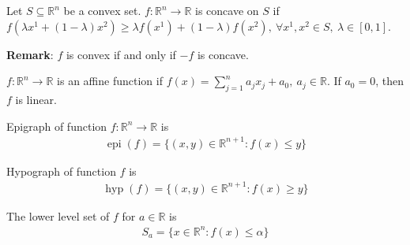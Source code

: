 \documentclass[11pt]{article}
\numberwithin{equation}{section}
\begin{document}
\begin{definition}
    Let $S \subseteq \mathbb{R}^n$ be a convex set. $f:\mathbb{R}^n\rightarrow \mathbb{R}$ is concave on $S$ if $f(\lambda x^1 + (1-\lambda)x^2) \geq \lambda f(x^1) + (1-\lambda)f(x^2), \ \forall x^1,x^2\in S, \ \lambda\in [0,1]$.
\end{definition}

\textbf{Remark}: $f$ is convex if and only if $-f$ is concave. 

\begin{definition}
    $f:\mathbb{R}^n\rightarrow \mathbb{R}$ is an affine function if $f(x)=\sum^n_{j=1}a_jx_j+a_0,\ a_j \in \mathbb{R}$. If $a_0=0$, then $f$ is linear.
\end{definition}
\begin{definition}
    Epigraph of function $f:\mathbb{R}^n\rightarrow \mathbb{R}$ is \begin{align*}
        \operatorname{epi}(f)=\{(x,y)\in \mathbb{R}^{n+1}:f(x)\leq y\}
    \end{align*}
\end{definition}

\begin{definition}
    Hypograph of function $f$ is \begin{align*}
        \operatorname{hyp}(f)=\{(x,y)\in \mathbb{R}^{n+1}:f(x)\geq y\}
    \end{align*}
\end{definition}
\begin{definition}
    The lower level set of $f$ for $a\in \mathbb{R}$ is \begin{align*}
        S_a=\{ x\in \mathbb{R}^n :f(x)\leq \alpha \}
    \end{align*}
\end{definition}
\end{document}
